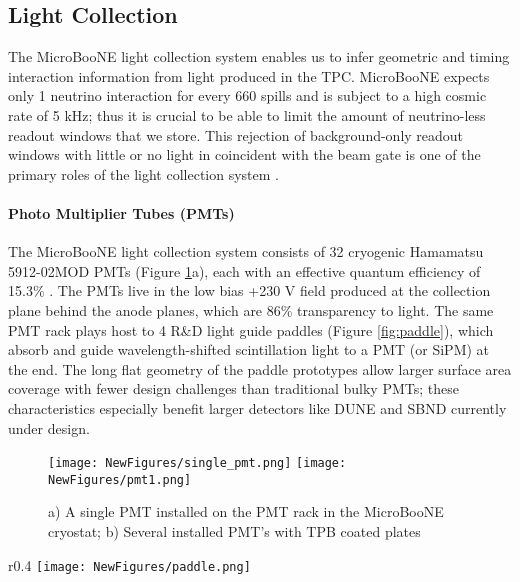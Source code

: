 \documentclass[12pt]{article}
\begin{document}
\subsection{Light Collection} \label{subsec:lightCollection}
\par The MicroBooNE light collection system enables us to infer geometric and timing interaction information from light produced in the TPC. MicroBooNE expects only 1 neutrino interaction for every 660 spills \cite{bib:first_nus} and is subject to a high cosmic rate of 5 kHz; thus it is crucial to be able to limit the amount of neutrino-less readout windows that we store. This rejection of background-only readout windows with little or no light in coincident with the beam gate is one of the primary roles of the light collection system \cite{bib:uboone_JINST}.

\paragraph{Photo Multiplier Tubes (PMTs)}

\par The MicroBooNE light collection system consists of 32 cryogenic Hamamatsu 5912-02MOD PMTs (Figure \ref{fig:pmt}a), each with an effective quantum efficiency of 15.3\% \cite{bib:ben_jones}. The PMTs live in the low bias +230 V field produced at the collection plane behind the anode planes, which are 86\% transparency to light.  The same PMT rack plays host to 4 R\&D light guide paddles (Figure \ref{fig:paddle}), which absorb and guide wavelength-shifted scintillation light to a PMT (or SiPM) at the end. The long flat geometry of the paddle prototypes allow larger surface area coverage with fewer design challenges than traditional bulky PMTs; these characteristics especially benefit larger detectors like DUNE and SBND currently under design.  

\begin{figure}[h!]
\centering
\texttt{[image: NewFigures/single\_pmt.png]}
\hspace{3 mm}
\texttt{[image: NewFigures/pmt1.png]}
\caption{ a) A single PMT installed on the PMT rack in the MicroBooNE cryostat; b) Several installed PMT's with TPB coated plates  } 
\label{fig:pmt}
\end{figure}

\begin{wrapfigure}{r}{0.4\textwidth}
\centering
\texttt{[image: NewFigures/paddle.png]}
\caption{One of the 4 lightguide prototypes in the MicroBooNE PMT rack}
\label{fig:paddle}
\end{wrapfigure}
\end{document}
